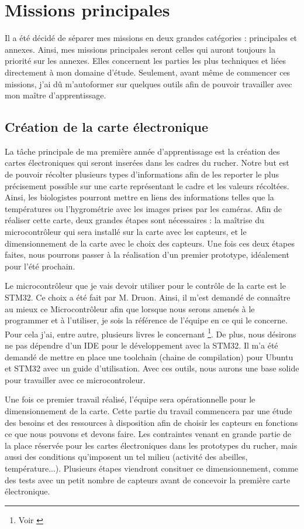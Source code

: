 \documentclass[11pt,french,a4paper]{report}
\begin{document}
\section{Missions principales}
Il a été décidé de séparer mes missions en deux grandes catégories : principales et annexes. Ainsi, mes missions principales 
seront celles qui auront toujours la priorité sur les annexes. Elles concernent les parties les plus techniques 
et liées directement à mon domaine d'étude. Seulement, avant même de commencer ces missions, j'ai dû m'autoformer sur 
quelques outils afin de pouvoir travailler avec mon maître d'apprentissage. 

\subsection{Création de la carte électronique}
La tâche principale de ma première année d'apprentissage est la création des cartes électroniques qui seront inserées dans 
les cadres du rucher. 
Notre but est de pouvoir récolter plusieurs types d'informations afin de les reporter le plus précisement possible sur une carte 
représentant le cadre et les valeurs récoltées. 
Ainsi, les biologistes pourront mettre en liens des informations telles que la températures ou l'hygrométrie avec les images 
prises par les caméras. 
Afin de réaliser cette carte, deux grandes étapes sont nécessaires : la maîtrise du microcontrôleur qui sera installé sur la 
carte avec les capteurs, et le dimensionnement de la carte avec le choix des capteurs. Une fois ces deux étapes faites, nous pourrons 
passer à la réalisation d'un premier prototype, idéalement pour l'été prochain. 

Le microcontrôleur que je vais devoir utiliser pour le contrôle de la carte est le STM32. Ce choix a été fait par M. Druon. 
Ainsi, il m'est demandé de connaître au mieux ce Microcontrôleur afin que lorsque nous serons amenés à le programmer et à l'utiliser, 
je sois la référence de l'équipe en ce qui le concerne. 
Pour cela j'ai, entre autre, plusieurs livres le concernant \footnote{Voir \cite{book1}}. 
De plus, nous désirons ne pas dépendre d'un IDE pour le développement avec la STM32. Il m'a été demandé de mettre en place 
une toolchain (chaine de compilation) pour Ubuntu et STM32 avec un guide d'utilisation. 
Avec ces outils, nous aurons une base solide pour travailler avec ce microcontroleur. 

Une fois ce premier travail réalisé, l'équipe sera opérationnelle pour le dimensionnement de la carte. Cette partie du travail
commencera par une étude des besoins et des ressources à disposition afin de choisir les capteurs en fonctions ce que nous pouvons
et devons faire. 
Les contraintes venant en grande partie de la place réservée pour les cartes électroniques dans les prototypes du rucher, mais 
aussi des conditions qu'imposent un tel milieu (activité des abeilles, température...). 
Plusieurs étapes viendront consituer ce dimensionnement, comme des tests avec un petit nombre de capteurs avant de concevoir la
première carte électronique. 
\end{document}
